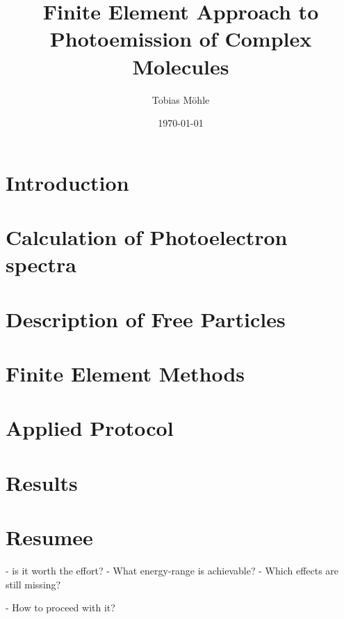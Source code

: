 \documentclass[12pt,a4paper,oneside]{book}
\author{Tobias M\"ohle}
\date{\today }
\title{Finite Element Approach to Photoemission of Complex Molecules}
\begin{document}
\indent
\pagestyle{plain}
\parindent6mm
\setlength{\parskip}{0mm}
\renewcommand{\vec}{\bm}
\newcommand{\mat}[1]{\mathbb{#1}}
\newcommand{\prog}[1]{\texttt{#1}}
\frontmatter
\maketitle
\tableofcontents
\newpage

\mainmatter
\chapter{Introduction} %


\chapter{Calculation of Photoelectron spectra}


\chapter{Description of Free Particles} 


\chapter{Finite Element Methods}


\chapter{Applied Protocol}


\chapter{Results}


\chapter{Resumee}
 - is it worth the effort?
 - What energy-range is achievable?
 - Which effects are still missing?

 - How to proceed with it?
\end{document}
